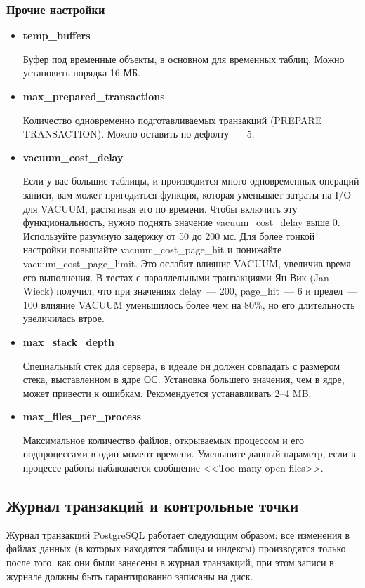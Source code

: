 \subsubsection{Прочие настройки}
\begin{itemize}
\item \textbf{temp\_buffers}

Буфер под временные объекты, в основном для временных таблиц.
Можно установить порядка 16 МБ.

\item \textbf{max\_prepared\_transactions}

Количество одновременно подготавливаемых транзакций (PREPARE TRANSACTION).
Можно оставить по дефолту~--- 5.

\item \textbf{vacuum\_cost\_delay}

Если у вас большие таблицы, и производится много одновременных операций записи,
вам может пригодиться функция, которая уменьшает затраты на I/O для VACUUM, растягивая его по времени.
Чтобы включить эту функциональность, нужно поднять
значение vacuum\_cost\_delay выше 0. Используйте разумную задержку от 50 до 200 мс. Для более тонкой настройки повышайте
vacuum\_cost\_page\_hit и понижайте vacuum\_cost\_page\_limit. Это ослабит влияние VACUUM, увеличив время его выполнения.
В тестах с параллельными транзакциями Ян Вик (Jan Wieck) получил, что при значениях delay~--- 200, page\_hit~--- 6 и предел~---
100 влияние VACUUM уменьшилось более чем на 80\%, но его длительность увеличилась втрое.

\item \textbf{max\_stack\_depth}

Специальный стек для сервера, в идеале он должен совпадать с размером стека, выставленном в ядре ОС.
Установка большего значения, чем в ядре, может привести к ошибкам.
Рекомендуется устанавливать 2--4 MB.

\item \textbf{max\_files\_per\_process}

Максимальное количество файлов, открываемых процессом и его подпроцессами в один момент времени.
Уменьшите данный параметр, если в процессе работы наблюдается сообщение <<Too many open files>>.
\end{itemize}


\subsection{Журнал транзакций и контрольные точки}
Журнал транзакций PostgreSQL работает следующим образом: все изменения в файлах данных (в которых находятся таблицы и
индексы) производятся только после того, как они были занесены в журнал транзакций, при этом записи в журнале должны
быть гарантированно записаны на диск.

